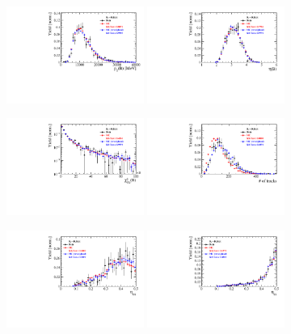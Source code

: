 \begin{figure}[h]
\centering
\includegraphics[height=!,width=0.4\textwidth]{figs/dataVsMC/signal_final/combined/Ds2KKpi_1_Bs_PT.pdf}
\includegraphics[height=!,width=0.4\textwidth]{figs/dataVsMC/signal_final/combined/Ds2KKpi_1_Bs_ETA.pdf}

\includegraphics[height=!,width=0.4\textwidth]{figs/dataVsMC/signal_final/combined/Ds2KKpi_1_Bs_FDCHI2_OWNPV.pdf}
\includegraphics[height=!,width=0.4\textwidth]{figs/dataVsMC/signal_final/combined/Ds2KKpi_1_NTracks.pdf}

\includegraphics[height=!,width=0.4\textwidth]{figs/dataVsMC/signal_final/combined/Ds2KKpi_1_Bs_TAGOMEGA_OS.pdf}
\includegraphics[height=!,width=0.4\textwidth]{figs/dataVsMC/signal_final/combined/Ds2KKpi_1_Bs_SS_nnetKaon_PROB.pdf}


\end{figure}
